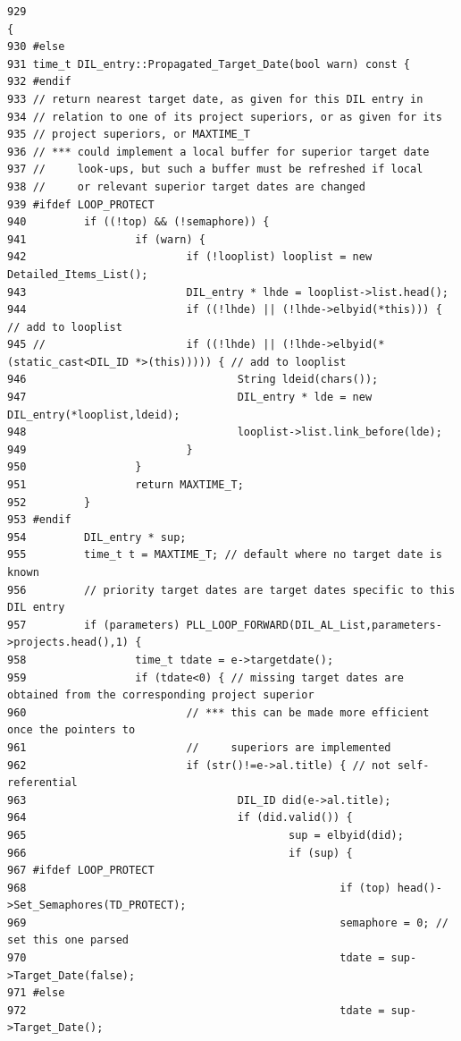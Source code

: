 \footnotesize\begin{verbatim}929                                                                          {
930 #else
931 time_t DIL_entry::Propagated_Target_Date(bool warn) const {
932 #endif
933 // return nearest target date, as given for this DIL entry in
934 // relation to one of its project superiors, or as given for its
935 // project superiors, or MAXTIME_T
936 // *** could implement a local buffer for superior target date
937 //     look-ups, but such a buffer must be refreshed if local
938 //     or relevant superior target dates are changed
939 #ifdef LOOP_PROTECT
940         if ((!top) && (!semaphore)) {
941                 if (warn) {
942                         if (!looplist) looplist = new Detailed_Items_List();
943                         DIL_entry * lhde = looplist->list.head();
944                         if ((!lhde) || (!lhde->elbyid(*this))) { // add to looplist
945 //                      if ((!lhde) || (!lhde->elbyid(*(static_cast<DIL_ID *>(this))))) { // add to looplist
946                                 String ldeid(chars());
947                                 DIL_entry * lde = new DIL_entry(*looplist,ldeid);
948                                 looplist->list.link_before(lde);
949                         }
950                 }
951                 return MAXTIME_T;
952         }
953 #endif
954         DIL_entry * sup;
955         time_t t = MAXTIME_T; // default where no target date is known
956         // priority target dates are target dates specific to this DIL entry
957         if (parameters) PLL_LOOP_FORWARD(DIL_AL_List,parameters->projects.head(),1) {
958                 time_t tdate = e->targetdate();
959                 if (tdate<0) { // missing target dates are obtained from the corresponding project superior
960                         // *** this can be made more efficient once the pointers to
961                         //     superiors are implemented
962                         if (str()!=e->al.title) { // not self-referential
963                                 DIL_ID did(e->al.title);
964                                 if (did.valid()) {
965                                         sup = elbyid(did);
966                                         if (sup) {
967 #ifdef LOOP_PROTECT
968                                                 if (top) head()->Set_Semaphores(TD_PROTECT);
969                                                 semaphore = 0; // set this one parsed
970                                                 tdate = sup->Target_Date(false);
971 #else
972                                                 tdate = sup->Target_Date();

\end{verbatim}
